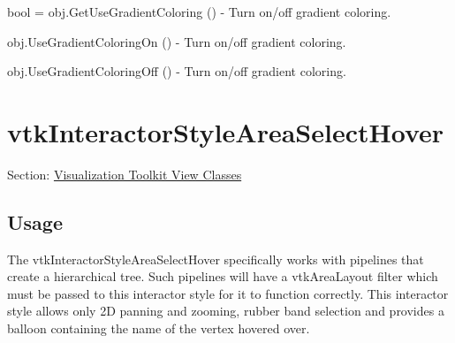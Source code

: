 \begin{DoxyItemize}
\item {\ttfamily bool = obj.\-Get\-Use\-Gradient\-Coloring ()} -\/ Turn on/off gradient coloring.  
\item {\ttfamily obj.\-Use\-Gradient\-Coloring\-On ()} -\/ Turn on/off gradient coloring.  
\item {\ttfamily obj.\-Use\-Gradient\-Coloring\-Off ()} -\/ Turn on/off gradient coloring.  
\end{DoxyItemize}\hypertarget{vtkviews_vtkinteractorstyleareaselecthover}{}\section{vtk\-Interactor\-Style\-Area\-Select\-Hover}\label{vtkviews_vtkinteractorstyleareaselecthover}
Section\-: \hyperlink{sec_vtkviews}{Visualization Toolkit View Classes} \hypertarget{vtkwidgets_vtkxyplotwidget_Usage}{}\subsection{Usage}\label{vtkwidgets_vtkxyplotwidget_Usage}
The vtk\-Interactor\-Style\-Area\-Select\-Hover specifically works with pipelines that create a hierarchical tree. Such pipelines will have a vtk\-Area\-Layout filter which must be passed to this interactor style for it to function correctly. This interactor style allows only 2\-D panning and zooming, rubber band selection and provides a balloon containing the name of the vertex hovered over.

